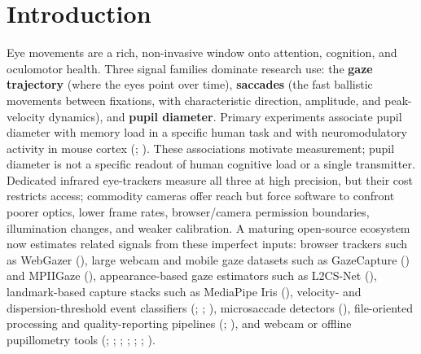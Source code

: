 \documentclass[
]{article}
\begin{document}
\section{Introduction}\label{sec:introduction}

Eye movements are a rich, non-invasive window onto attention, cognition,
and oculomotor health. Three signal families dominate research use: the
\textbf{gaze trajectory} (where the eyes point over time),
\textbf{saccades} (the fast ballistic movements between fixations, with
characteristic direction, amplitude, and peak-velocity dynamics), and
\textbf{pupil diameter}. Primary experiments associate pupil diameter
with memory load in a specific human task and with neuromodulatory
activity in mouse cortex (; ). These
associations motivate measurement; pupil diameter is not a specific
readout of human cognitive load or a single transmitter. Dedicated
infrared eye-trackers measure all three at high precision, but their
cost restricts access; commodity cameras offer reach but force software
to confront poorer optics, lower frame rates, browser/camera permission
boundaries, illumination changes, and weaker calibration. A maturing
open-source ecosystem now estimates related signals from these imperfect
inputs: browser trackers such as WebGazer
(), large
webcam and mobile gaze datasets such as GazeCapture
() and MPIIGaze
(), appearance-based
gaze estimators such as L2CS-Net
(), landmark-based
capture stacks such as MediaPipe Iris
(),
velocity- and dispersion-threshold event classifiers
(;
;
), microsaccade detectors
(),
file-oriented processing and quality-reporting pipelines
(;
), and webcam or
offline pupillometry tools (; ;
;
;
;
;
).
\end{document}
